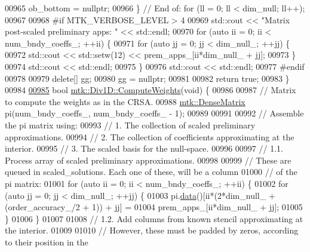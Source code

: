 \begin{DoxyCode}
{{00965     ob\_bottom = \textcolor{keyword}{nullptr};
00966   \} \textcolor{comment}{// End of: for (ll = 0; ll < dim\_null; ll++);}
00967 
00968 \textcolor{preprocessor}{  #if MTK\_VERBOSE\_LEVEL > 4}
00969   std::cout << \textcolor{stringliteral}{"Matrix post-scaled preliminary apps: "} << std::endl;
00970   \textcolor{keywordflow}{for} (\textcolor{keyword}{auto} ii = 0; ii < num\_bndy\_coeffs\_; ++ii) \{
00971     \textcolor{keywordflow}{for} (\textcolor{keyword}{auto} jj = 0; jj < dim\_null\_; ++jj) \{
00972       std::cout << std::setw(12) << prem\_apps\_[ii*dim\_null\_ + jj];
00973     \}
00974     std::cout << std::endl;
00975   \}
00976   std::cout << std::endl;
00977 \textcolor{preprocessor}{  #endif}
00978 
00979   \textcolor{keyword}{delete}[] gg;
00980   gg = \textcolor{keyword}{nullptr};
00981 
00982   \textcolor{keywordflow}{return} \textcolor{keyword}{true};
00983 \}
00984 
\hypertarget{mtk__div__1d_8cc_source_l00985}{}\hyperlink{classmtk_1_1Div1D_aaadd6a6e6836bb94841c4c35dffab828}{00985} \textcolor{keywordtype}{bool} \hyperlink{classmtk_1_1Div1D_aaadd6a6e6836bb94841c4c35dffab828}{mtk::Div1D::ComputeWeights}(\textcolor{keywordtype}{void}) \{
00986 
00987   \textcolor{comment}{// Matrix to compute the weights as in the CRSA.}
00988   \hyperlink{classmtk_1_1DenseMatrix}{mtk::DenseMatrix} pi(num\_bndy\_coeffs\_, num\_bndy\_coeffs\_ - 1);
00989 
00991 
00992   \textcolor{comment}{// Assemble the pi matrix using:}
00993   \textcolor{comment}{// 1. The collection of scaled preliminary approximations.}
00994   \textcolor{comment}{// 2. The collection of coefficients approximating at the interior.}
00995   \textcolor{comment}{// 3. The scaled basis for the null-space.}
00996 
00997   \textcolor{comment}{// 1.1. Process array of scaled preliminary approximations.}
00998 
00999   \textcolor{comment}{// These are queued in scaled\_solutions. Each one of these, will be a column}
01000   \textcolor{comment}{// of the pi matrix:}
01001   \textcolor{keywordflow}{for} (\textcolor{keyword}{auto} ii = 0; ii < num\_bndy\_coeffs\_; ++ii) \{
01002     \textcolor{keywordflow}{for} (\textcolor{keyword}{auto} jj = 0; jj < dim\_null\_; ++jj) \{
01003       pi.\hyperlink{classmtk_1_1DenseMatrix_a0c33b8a9e01d157c61ddbdf807c25d84}{data}()[ii*(2*dim\_null\_ + (order\_accuracy\_/2 + 1)) + jj] =
01004         prem\_apps\_[ii*dim\_null\_ + jj];
01005     \}
01006   \}
01007 
01008   \textcolor{comment}{// 1.2. Add columns from known stencil approximating at the interior.}
01009 
01010   \textcolor{comment}{// However, these must be padded by zeros, according to their position in the}
}}
\end{DoxyCode}
